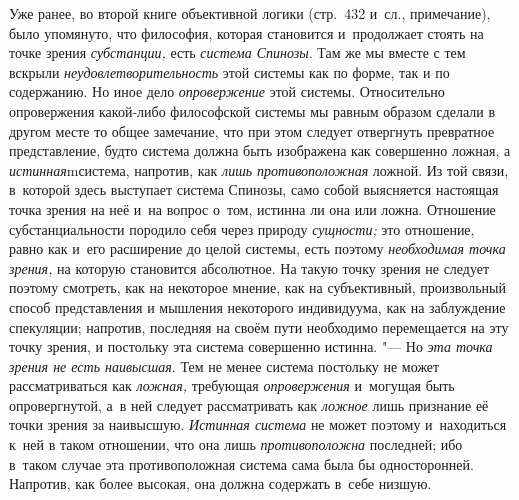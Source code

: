 Уже ранее, во второй книге объективной логики (стр.~432 и~сл., примечание),
было упомянуто, что философия, которая становится и~продолжает стоять на
точке зрения {\em субстанции,} есть {\em система Спинозы}. Там же мы вместе
с тем вскрыли {\em неудовлетворительность} этой системы как по форме, так и
по содержанию. Но иное дело {\em опровержение} этой системы. Относительно
опровержения какой-либо философской системы мы равным образом сделали в
другом месте то общее замечание, что при этом следует отвергнуть превратное
представление, будто система должна быть изображена как совершенно ложная,
а {\em истинная}mсистема, напротив, как {\em лишь противоположная} ложной.
Из той связи, в~которой здесь выступает система Спинозы, само собой
выясняется настоящая точка зрения на неё и~на вопрос о~том, истинна ли она
или ложна. Отношение субстанциальности породило себя через природу
{\em сущности;} это отношение, равно как и~его расширение до целой системы,
есть поэтому {\em необходимая точка зрения,} на которую становится
абсолютное. На такую точку зрения не следует поэтому смотреть, как на
некоторое мнение, как на субъективный, произвольный способ представления и
мышления некоторого индивидуума, как на заблуждение спекуляции; напротив,
последняя на своём пути необходимо перемещается на эту точку зрения, и
постольку эта система совершенно истинна. "--- Но {\em эта точка зрения не есть
наивысшая}. Тем не менее система постольку не может рассматриваться как
{\em ложная,} требующая {\em опровержения} и~могущая быть опровергнутой, а~в
ней следует рассматривать как {\em ложное} лишь признание её точки зрения за
наивысшую. {\em Истинная система} не может поэтому и~находиться к~ней в
таком отношении, что она лишь {\em противоположна} последней; ибо в~таком
случае эта противоположная система сама была бы односторонней. Напротив, как
более высокая, она должна содержать в~себе низшую.

